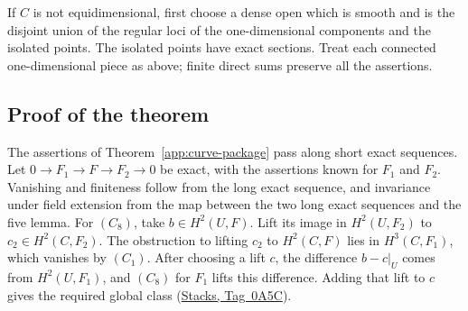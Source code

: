 \documentclass[11pt,a4paper]{article}
\numberwithin{equation}{section}
\theoremstyle{definition}
\theoremstyle{remark}
\newcommand{\stacks}[1]{\href{https://stacks.math.columbia.edu/tag/#1}{\textnormal{Stacks, Tag~#1}}}
\begin{document}
If $C$ is not equidimensional, first choose a dense open which is
smooth and is the disjoint union of the regular loci of the
one-dimensional components and the isolated points.  The isolated
points have exact sections.  Treat each connected one-dimensional piece
as above; finite direct sums preserve all the assertions.

\subsection{Proof of the theorem}

The assertions of Theorem~\ref{app:curve-package} pass along short
exact sequences.  Let $0\to F_1\to F\to F_2\to0$ be exact, with the
assertions known for $F_1$ and $F_2$.  Vanishing and finiteness follow
from the long exact sequence, and invariance under field extension
from the map between the two long exact sequences and the five lemma.
For $(C_8)$, take $b\in H^2(U,F)$.  Lift its image in $H^2(U,F_2)$ to
$c_2\in H^2(C,F_2)$.  The obstruction to lifting $c_2$ to $H^2(C,F)$
lies in $H^3(C,F_1)$, which vanishes by $(C_1)$.  After choosing a lift
$c$, the difference $b-c|_U$ comes from $H^2(U,F_1)$, and $(C_8)$ for
$F_1$ lifts this difference.  Adding that lift to $c$ gives the
required global class (\stacks{0A5C}).
\end{document}
